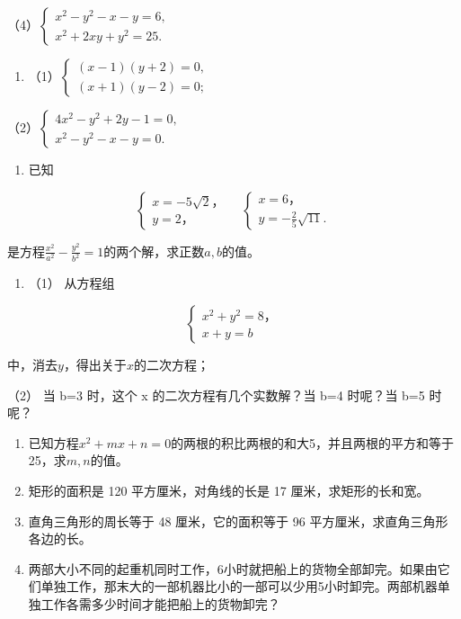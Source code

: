 （4）\(\left\{ \begin{array}{l} x^{2} - y^{2} - x - y = 6, \\ x^{2} + 2xy + y^{2} = 25. \end{array} \right.\)

\begin{enumerate}[start=6]
\item
  （1）\(\left\{ \begin{array}{l} (x - 1)(y + 2) = 0, \\ (x + 1)(y - 2) = 0; \end{array} \right.\)
\end{enumerate}

（2）\(\left\{ \begin{array}{l} 4x^{2} - y^{2} + 2y - 1 = 0, \\ x^{2} - y^{2} - x - y = 0. \end{array} \right.\)

\begin{enumerate}[start=7]
\item
  已知
\end{enumerate}

\[
\left\{ \begin{array}{l} x = - 5 \sqrt {2}\text{，} \\ y = 2\text{，} \end{array} \right. \quad \left\{ \begin{array}{l} x = 6\text{，} \\ y = - \frac{2}{5} \sqrt {11}. \end{array} \right.
\]

是方程\(\frac{x^2}{a^2} -\frac{y^2}{b^2} = 1\)的两个解，求正数\(a,b\)的值。

\begin{enumerate}[start=8]
\item
  （1） 从方程组
\end{enumerate}

\[
\left\{ \begin{array}{l} x ^ {2} + y ^ {2} = 8\text{，} \\ x + y = b \end{array} \right.
\]

中，消去\(y\)，得出关于\(x\)的二次方程；

（2） 当 b=3 时，这个 x 的二次方程有几个实数解？当 b=4 时呢？当 b=5
时呢？

\begin{enumerate}[start=9]
\item
  已知方程\(x^{2} + mx + n = 0\)的两根的积比两根的和大5，并且两根的平方和等于25，求\(m, n\)的值。
\item
  矩形的面积是 120 平方厘米，对角线的长是 17 厘米，求矩形的长和宽。
\item
  直角三角形的周长等于 48 厘米，它的面积等于 96
  平方厘米，求直角三角形各边的长。
\item
  两部大小不同的起重机同时工作，6小时就把船上的货物全部卸完。如果由它们单独工作，那末大的一部机器比小的一部可以少用5小时卸完。两部机器单独工作各需多少时间才能把船上的货物卸完？
\end{enumerate}

